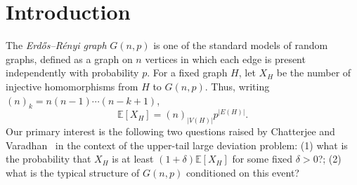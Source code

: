 \section{Introduction}\label{sec:introduction}
The \emph{Erd\H{o}s--R\'enyi graph} $G(n,p)$ is one of the standard models of random graphs, defined as a graph on $n$ vertices in which each edge is present independently with probability $p$.
For a fixed graph $H$, let $X_H$ be the number of injective homomorphisms from
$H$ to $G(n,p)$.  Thus, writing
$(n)_k=n(n-1)\cdots(n-k+1)$,
\[
  \mathbb{E}[X_H]=(n)_{|V(H)|}p^{|E(H)|}.
\]
Our primary interest is the following two questions raised by Chatterjee and Varadhan~\cite{ChatterjeeVaradhanLDP} in the context of the upper-tail large deviation problem: (1) what is the probability that $X_H$ is at least $(1+\delta)\mathbb{E}[X_H]$ for some fixed $\delta>0$?; (2) what is the typical structure of $G(n,p)$ conditioned on this event?

